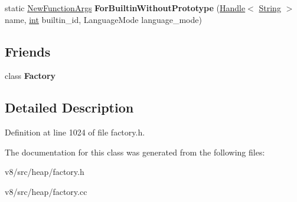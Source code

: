 \begin{DoxyCompactItemize}
\item 
\mbox{\label{classv8_1_1internal_1_1NewFunctionArgs_a842d96d78faae01805cc534005760543}} 
static \mbox{\hyperlink{classv8_1_1internal_1_1NewFunctionArgs}{New\+Function\+Args}} {\bfseries For\+Builtin\+Without\+Prototype} (\mbox{\hyperlink{classv8_1_1internal_1_1Handle}{Handle}}$<$ \mbox{\hyperlink{classv8_1_1internal_1_1String}{String}} $>$ name, \mbox{\hyperlink{classint}{int}} builtin\+\_\+id, Language\+Mode language\+\_\+mode)
\end{DoxyCompactItemize}
\subsection*{Friends}
\begin{DoxyCompactItemize}
\item 
\mbox{\label{classv8_1_1internal_1_1NewFunctionArgs_a328c093d609680cca505905c6d49901a}} 
class {\bfseries Factory}
\end{DoxyCompactItemize}


\subsection{Detailed Description}


Definition at line 1024 of file factory.\+h.



The documentation for this class was generated from the following files\+:\begin{DoxyCompactItemize}
\item 
v8/src/heap/factory.\+h\item 
v8/src/heap/factory.\+cc\end{DoxyCompactItemize}
